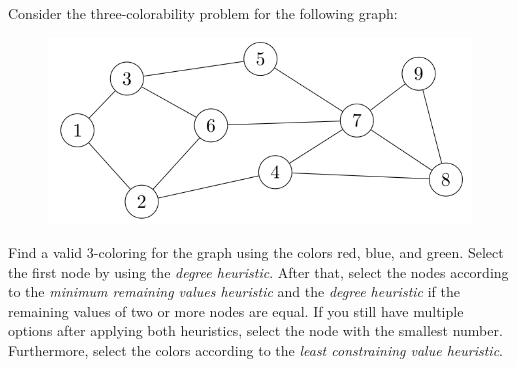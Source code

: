 Consider the three-colorability problem for the following graph:
\begin{figure}[h!]
    \centering
    \includegraphics[scale=0.5]{img/cspgraph.png}
\end{figure}

Find a valid 3-coloring for the graph using the colors red, blue, and green. Select the first node by using the \textit{degree heuristic}. After that, select the nodes according to the \textit{minimum remaining values heuristic} and the \textit{degree heuristic} if the remaining values of two or more nodes are equal. If you still have multiple options after applying both heuristics, select the node with the smallest number. Furthermore, select the colors according to the \textit{least constraining value heuristic}.
